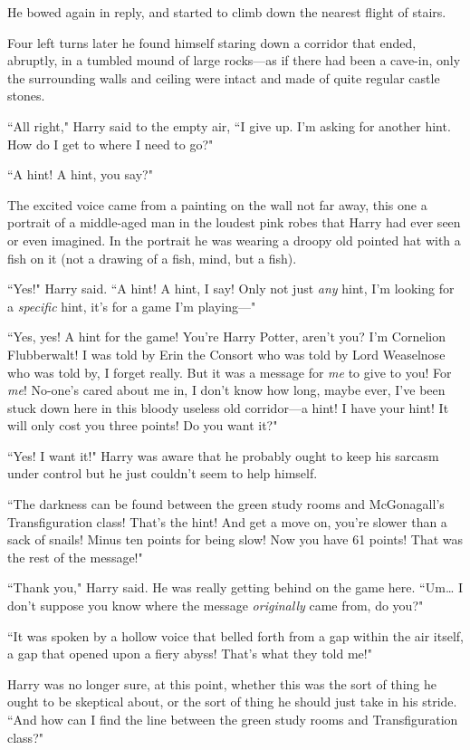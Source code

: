 He bowed again in reply, and started to climb down the nearest flight of stairs.

Four left turns later he found himself staring down a corridor that ended, abruptly, in a tumbled mound of large rocks—as if there had been a cave-in, only the surrounding walls and ceiling were intact and made of quite regular castle stones.

``All right," Harry said to the empty air, ``I give up. I'm asking for another hint. How do I get to where I need to go?"

``A hint! A hint, you say?"

The excited voice came from a painting on the wall not far away, this one a portrait of a middle-aged man in the loudest pink robes that Harry had ever seen or even imagined. In the portrait he was wearing a droopy old pointed hat with a fish on it (not a drawing of a fish, mind, but a fish).

``Yes!" Harry said. ``A hint! A hint, I say! Only not just \emph{any} hint, I'm looking for a \emph{specific} hint, it's for a game I'm playing—"

``Yes, yes! A hint for the game! You're Harry Potter, aren't you? I'm Cornelion Flubberwalt! I was told by Erin the Consort who was told by Lord Weaselnose who was told by, I forget really. But it was a message for \emph{me} to give to you! For \emph{me}! No-one's cared about me in, I don't know how long, maybe ever, I've been stuck down here in this bloody useless old corridor—a hint! I have your hint! It will only cost you three points! Do you want it?"

``Yes! I want it!" Harry was aware that he probably ought to keep his sarcasm under control but he just couldn't seem to help himself.

``The darkness can be found between the green study rooms and McGonagall's Transfiguration class! That's the hint! And get a move on, you're slower than a sack of snails! Minus ten points for being slow! Now you have 61 points! That was the rest of the message!"

``Thank you," Harry said. He was really getting behind on the game here. ``Um{\ldots} I don't suppose you know where the message \emph{originally} came from, do you?"

``It was spoken by a hollow voice that belled forth from a gap within the air itself, a gap that opened upon a fiery abyss! That's what they told me!"

Harry was no longer sure, at this point, whether this was the sort of thing he ought to be skeptical about, or the sort of thing he should just take in his stride. ``And how can I find the line between the green study rooms and Transfiguration class?"

